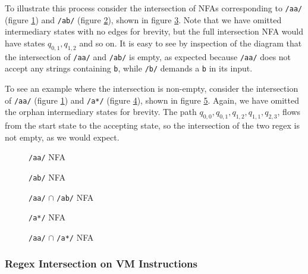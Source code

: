 To illustrate this process consider the intersection of NFAs corresponding
to \verb'/aa/' (figure \ref{fig:NFAaa}) and \verb'/ab/'
(figure \ref{fig:NFAab}), shown in figure \ref{fig:NFAaa:ab}. Note that
we have omitted intermediary states with no edges for brevity, but the
full intersection NFA would have states $q_{0,1}, q_{1,2}$ and so on.
It is easy to see by inspection of the diagram that the intersection of
\verb'/aa/' and \verb'/ab/' is empty, as expected because
\verb'/aa/' does not accept any strings containing \verb'b', while
\verb'/b/' demands a \verb'b' in its input.

To see an example where the intersection is non-empty, consider the
intersection of \verb'/aa/' (figure \ref{fig:NFAaa}) and \verb'/a*/'
(figure \ref{fig:NFAastar}), shown in figure \ref{fig:NFAaa:astar}.
Again, we have omitted the orphan intermediary states for brevity.
The path $q_{0,0}, q_{0,1}, q_{1,2}, q_{1,1}, q_{2,3}$, flows from
the start state to the accepting state, so the intersection of the
two regex is not empty, as we would expect.

\begin{figure}
\centering
\caption{{\tt /aa/} NFA}
    
\label{fig:NFAaa}
\end{figure}

\begin{figure}
\centering
\caption{{\tt /ab/} NFA}
    
\label{fig:NFAab}
\end{figure}


\begin{figure}
\centering
\caption{{\tt /aa/} $\cap$ {\tt /ab/} NFA}
    
\label{fig:NFAaa:ab}
\end{figure}

\begin{figure}
\centering
\caption{{\tt /a*/} NFA}
    
\label{fig:NFAastar}
\end{figure}

\begin{figure}
\centering
\caption{{\tt /aa/} $\cap$ {\tt /a*/} NFA}
    
\label{fig:NFAaa:astar}
\end{figure}

\subsubsection{Regex Intersection on VM Instructions}

